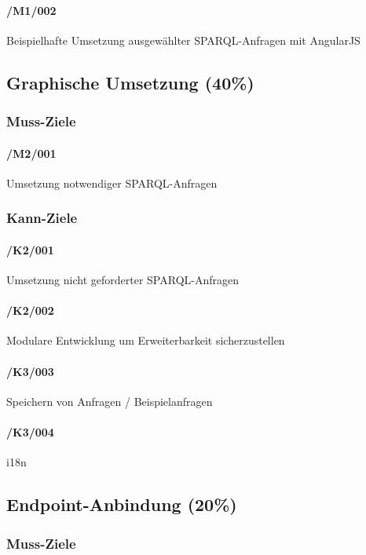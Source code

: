 \paragraph{/M1/002} Beispielhafte Umsetzung ausgewählter SPARQL-Anfragen mit AngularJS

\subsection{Graphische Umsetzung (40\%)}

\subsubsection*{Muss-Ziele}

\paragraph{/M2/001} Umsetzung notwendiger SPARQL-Anfragen

\subsubsection*{Kann-Ziele}

\paragraph{/K2/001} Umsetzung nicht geforderter SPARQL-Anfragen
\paragraph{/K2/002} Modulare Entwicklung um Erweiterbarkeit sicherzustellen
\paragraph{/K3/003} Speichern von Anfragen / Beispielanfragen
\paragraph{/K3/004} i18n

\subsection{Endpoint-Anbindung (20\%)}

\subsubsection*{Muss-Ziele}


